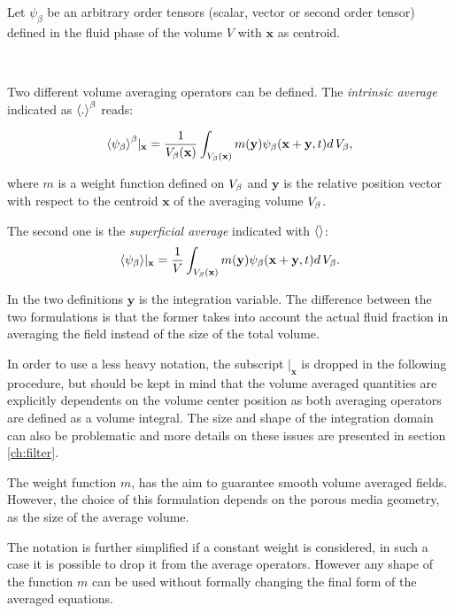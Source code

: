 Let $\psi_{\beta}$ be an arbitrary order tensors (scalar, vector or second order tensor) defined in the fluid phase of the volume $V$ with $\mathbf{x}$ as centroid.

\newpage 

$\quad$

\newpage

Two different volume averaging operators can be defined. The \textit{intrinsic average} indicated as ${\left< . \right>}^{\beta}$ reads:

\begin{equation}
	{\left< \psi_{\beta} \right>}^{\beta}|_{\mathbf{x}} = \dfrac{1}{V_\beta(\mathbf{x})} \int_{V_\beta(\mathbf{x})}  m(\mathbf{y}) \psi_{\beta}(\mathbf{x}+\mathbf{y}, t) d \, V_\beta,
	\label{eq:avg_intrinsic}
\end{equation}

\noindent where $m$ is a weight function defined on $V_\beta$ and $\mathbf{y}$ is the relative position vector with respect to the centroid $\mathbf{x}$ of the averaging volume $V_\beta$.

The second one is the \textit{superficial average} indicated with ${\left<  \right>}$:
\begin{equation}
	{\left< \psi_{\beta} \right>}|_{\mathbf{x}} = \dfrac{1}{V} \int_{V_\beta(\mathbf{x})} m(\mathbf{y}) \psi_{\beta}(\mathbf{x}+\mathbf{y}, t) d \, V_\beta.
	\label{eq:avg_superficial}
\end{equation}

In the two definitions $\mathbf{y}$ is the integration variable.
The difference between the two formulations is that the former takes into account the actual fluid fraction in averaging the field instead of the size of the total volume.

In order to use a less heavy notation, the subscript $|_{\mathbf{x}}$ is dropped in the following procedure, but should be kept in mind that the volume averaged quantities are explicitly dependents on the volume center position as both averaging operators are defined as a volume integral.
The size and shape of the integration domain can also be problematic and more details on these issues are presented in section \ref{ch:filter}.

The weight function $m$, has the aim to guarantee smooth volume averaged fields.
However, the choice of this formulation depends on the porous media geometry, as the size of the average volume.

The notation is further simplified if a constant weight is considered, in such a case it is possible to drop it from the average operators.
However any shape of the function $m$ can be used without formally changing the final form of the averaged equations.

